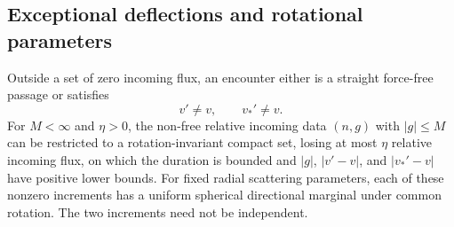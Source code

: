 \subsection{Exceptional deflections and rotational parameters}

\begin{proposition}\label{pre:scattering}
Outside a set of zero incoming flux, an encounter either is a straight
force-free passage or satisfies
\begin{equation}\label{eq:pre-increments}
 v'\ne v,\qquad v_*'\ne v .
\end{equation}
For $M<\infty$ and $\eta>0$, the non-free relative incoming data $(n,g)$
with $|g|\leq M$
can be restricted to a rotation-invariant compact set, losing at most
$\eta$ relative incoming flux, on which the duration is bounded and
$|g|$, $|v'-v|$, and $|v_*'-v|$ have positive lower bounds.
For fixed radial scattering parameters, each of these nonzero
increments has a uniform spherical directional marginal under common
rotation. The two increments need not be independent.
\end{proposition}

